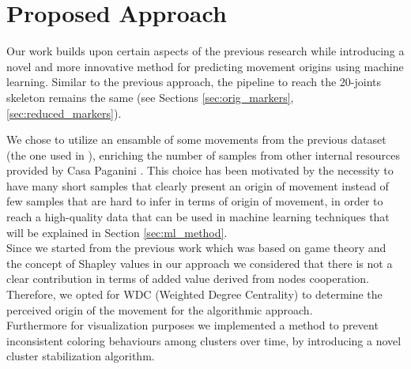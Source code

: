 \chapter{Proposed Approach}

Our work builds upon certain aspects of the previous research while introducing a novel and more innovative method for predicting movement origins using machine learning. 
Similar to the previous approach, the pipeline to reach the 20-joints skeleton remains the same (see Sections \ref{sec:orig_markers}, \ref{sec:reduced_markers}).

We chose to utilize an ensamble of some movements from the previous dataset (the one used in \cite{kolykhalova:2020}), enriching the number of samples from other internal resources provided by Casa Paganini \cite{casaPaganini}. 
This choice has been motivated by the necessity to have many short samples that clearly present an origin of movement instead of few samples that are hard to infer in terms of origin of movement, in order to 
reach a high-quality data that can be used in machine learning techniques that will be explained in Section \ref{sec:ml_method}.\\
Since we started from the previous work which was based on game theory and the concept of Shapley values in our approach we considered that there is not a clear contribution in terms of added value derived from nodes cooperation. 
Therefore, we opted for WDC (Weighted Degree Centrality) to determine the perceived origin of the movement for the algorithmic approach.\\
Furthermore for visualization purposes we implemented a method to prevent inconsistent coloring behaviours among clusters over time, by introducing a novel cluster stabilization algorithm. 

